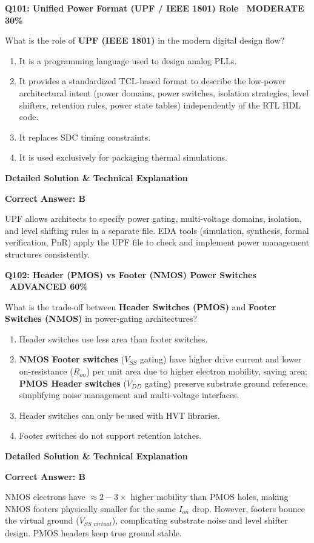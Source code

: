 \documentclass[11pt,a4paper]{article}
\newcommand{\badgeadv}{{\color{white}\colorbox{advred}{\bfseries\sffamily\tiny\ ADVANCED 60\%\ }}}
\newcommand{\badgemod}{{\color{white}\colorbox{modoran}{\bfseries\sffamily\tiny\ MODERATE 30\%\ }}}
\newenvironment{qbox}[2]{%
  \begin{mdframed}[style=qstyle]%
  {\bfseries\sffamily\color{primaryblue}#1 \hfill #2}\par\vspace{2pt}%
}{%
  \end{mdframed}%
}
\newenvironment{ansbox}{%
  \begin{mdframed}[style=ansstyle]%
  {\bfseries\sffamily\color{ansgreen}\small Detailed Solution \& Technical Explanation}\par\vspace{2pt}\small%
}{%
  \end{mdframed}%
}
\begin{document}
\begin{qbox}{Q101: Unified Power Format (UPF / IEEE 1801) Role}{\badgemod}
What is the role of \textbf{UPF (IEEE 1801)} in the modern digital design flow?
\begin{enumerate}[label=\textbf{\Alph*.}]
  \item It is a programming language used to design analog PLLs.
  \item It provides a standardized TCL-based format to describe the low-power architectural intent (power domains, power switches, isolation strategies, level shifters, retention rules, power state tables) independently of the RTL HDL code.
  \item It replaces SDC timing constraints.
  \item It is used exclusively for packaging thermal simulations.
\end{enumerate}
\end{qbox}
\begin{ansbox}
\textbf{Correct Answer: B}

UPF allows architects to specify power gating, multi-voltage domains, isolation, and level shifting rules in a separate file. EDA tools (simulation, synthesis, formal verification, PnR) apply the UPF file to check and implement power management structures consistently.
\end{ansbox}

\begin{qbox}{Q102: Header (PMOS) vs Footer (NMOS) Power Switches}{\badgeadv}
What is the trade-off between \textbf{Header Switches (PMOS)} and \textbf{Footer Switches (NMOS)} in power-gating architectures?
\begin{enumerate}[label=\textbf{\Alph*.}]
  \item Header switches use less area than footer switches.
  \item \textbf{NMOS Footer switches} ($V_{SS}$ gating) have higher drive current and lower on-resistance ($R_{on}$) per unit area due to higher electron mobility, saving area; \textbf{PMOS Header switches} ($V_{DD}$ gating) preserve substrate ground reference, simplifying noise management and multi-voltage interfaces.
  \item Header switches can only be used with HVT libraries.
  \item Footer switches do not support retention latches.
\end{enumerate}
\end{qbox}
\begin{ansbox}
\textbf{Correct Answer: B}

NMOS electrons have $\approx 2-3\times$ higher mobility than PMOS holes, making NMOS footers physically smaller for the same $I_{on}$ drop. However, footers bounce the virtual ground ($V_{SS\_virtual}$), complicating substrate noise and level shifter design. PMOS headers keep true ground stable.
\end{ansbox}
\end{document}
